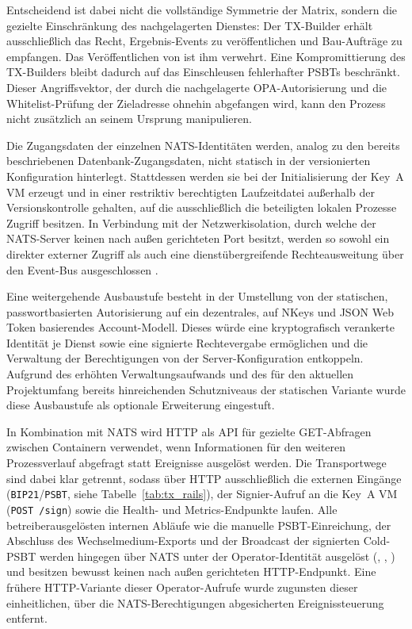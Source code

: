 Entscheidend ist dabei nicht die vollständige Symmetrie der Matrix, sondern die gezielte Einschränkung des nachgelagerten Dienstes: Der TX-Builder erhält ausschließlich das Recht, Ergebnis-Events zu veröffentlichen und Bau-Aufträge zu empfangen. Das Veröffentlichen von \texttt{} ist ihm verwehrt. Eine Kompromittierung des TX-Builders bleibt dadurch auf das Einschleusen fehlerhafter \acp{PSBT} beschränkt. Dieser Angriffsvektor, der durch die nachgelagerte \ac{OPA}-Autorisierung und die Whitelist-Prüfung der Zieladresse ohnehin abgefangen wird, kann den Prozess nicht zusätzlich an seinem Ursprung manipulieren.

Die Zugangsdaten der einzelnen \ac{NATS}-Identitäten werden, analog zu den bereits beschriebenen Datenbank-Zugangsdaten, nicht statisch in der versionierten Konfiguration hinterlegt. Stattdessen werden sie bei der Initialisierung der Key~A \ac{VM} erzeugt und in einer restriktiv berechtigten Laufzeitdatei außerhalb der Versionskontrolle gehalten, auf die ausschließlich die beteiligten lokalen Prozesse Zugriff besitzen. In Verbindung mit der Netzwerkisolation, durch welche der \ac{NATS}-Server keinen nach außen gerichteten Port besitzt, werden so sowohl ein direkter externer Zugriff als auch eine dienstübergreifende Rechteausweitung über den Event-Bus ausgeschlossen \cite{NATS_Auth}.

Eine weitergehende Ausbaustufe besteht in der Umstellung von der statischen, passwortbasierten Autorisierung auf ein dezentrales, auf NKeys und JSON Web Token basierendes Account-Modell. Dieses würde eine kryptografisch verankerte Identität je Dienst sowie eine signierte Rechtevergabe ermöglichen und die Verwaltung der Berechtigungen von der Server-Konfiguration entkoppeln. Aufgrund des erhöhten Verwaltungsaufwands und des für den aktuellen Projektumfang bereits hinreichenden Schutzniveaus der statischen Variante wurde diese Ausbaustufe als optionale Erweiterung eingestuft.

In Kombination mit \ac{NATS} wird \ac{HTTP} als \ac{API} für gezielte GET-Abfragen zwischen Containern verwendet, wenn Informationen für den weiteren Prozessverlauf abgefragt statt Ereignisse ausgelöst werden. Die Transportwege sind dabei klar getrennt, sodass über \ac{HTTP} ausschließlich die externen Eingänge (\texttt{BIP21}/\texttt{PSBT}, siehe Tabelle~\ref{tab:tx_rails}), der Signier-Aufruf an die Key~A \ac{VM} (\texttt{POST /sign}) sowie die Health- und Metrics-Endpunkte laufen. Alle betreiberausgelösten internen Abläufe wie die manuelle \ac{PSBT}-Einreichung, der Abschluss des Wechselmedium-Exports und der Broadcast der signierten Cold-\ac{PSBT} werden hingegen über \ac{NATS} unter der Operator-Identität ausgelöst (\texttt{}, \texttt{}, \texttt{}) und besitzen bewusst keinen nach außen gerichteten \ac{HTTP}-Endpunkt. Eine frühere \ac{HTTP}-Variante dieser Operator-Aufrufe wurde zugunsten dieser einheitlichen, über die \ac{NATS}-Berechtigungen abgesicherten Ereignissteuerung entfernt.

